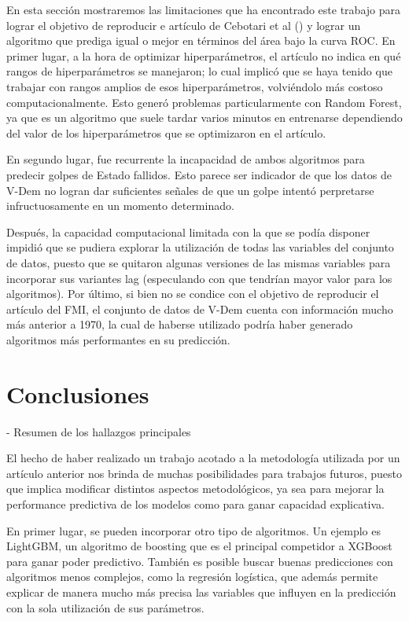\documentclass{article}
\begin{document}
En esta sección mostraremos las limitaciones que ha encontrado este trabajo para lograr el objetivo de
reproducir e artículo de Cebotari et al (\citeyear{Ceb24}) y lograr un algoritmo que prediga igual o mejor
en términos del área bajo la curva ROC. En primer lugar, a la hora de optimizar hiperparámetros, el artículo
no indica en qué rangos de hiperparámetros se manejaron; lo cual implicó que se haya tenido que trabajar
con rangos amplios de esos hiperparámetros, volviéndolo más costoso computacionalmente. Esto generó problemas
particularmente con Random Forest, ya que es un algoritmo que suele tardar varios minutos en entrenarse 
dependiendo del valor de los hiperparámetros que se optimizaron en el artículo.

En segundo lugar, fue recurrente la incapacidad de ambos algoritmos para predecir golpes de Estado fallidos.
Esto parece ser indicador de que los datos de V-Dem no logran dar suficientes señales de que un golpe intentó
perpretarse infructuosamente en un momento determinado.

Después, la capacidad computacional limitada con la que se podía disponer impidió que se pudiera explorar
la utilización de todas las variables del conjunto de datos, puesto que se quitaron algunas versiones de las 
mismas variables para incorporar sus variantes lag (especulando con que tendrían mayor valor para los 
algoritmos). Por último, si bien no se condice con el objetivo de reproducir el artículo del FMI, el conjunto de
datos de V-Dem cuenta con información mucho más anterior a 1970, la cual de haberse utilizado podría haber
generado algoritmos más performantes en su predicción.

\section{Conclusiones}
- Resumen de los hallazgos principales


El hecho de haber realizado un trabajo acotado a la metodología utilizada por un artículo anterior nos 
brinda de muchas posibilidades para trabajos futuros, puesto que implica modificar distintos aspectos 
metodológicos, ya sea para mejorar la performance predictiva de los modelos como para ganar capacidad
explicativa. 

En primer lugar, se pueden incorporar otro tipo de algoritmos. Un ejemplo es LightGBM, un algoritmo de boosting
que es el principal competidor a XGBoost para ganar poder predictivo. También es posible buscar buenas
predicciones con algoritmos menos complejos, como la regresión logística, que además permite explicar de
manera mucho más precisa las variables que influyen en la predicción con la sola utilización de sus parámetros.
\end{document}

